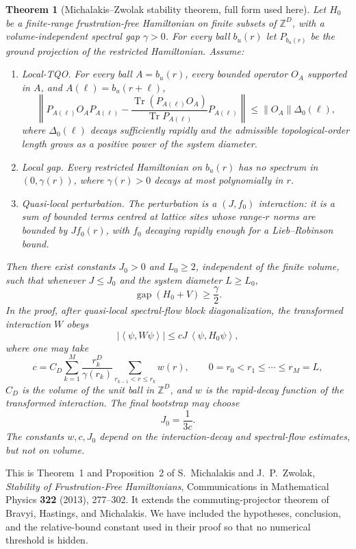 \documentclass[11pt]{article}
\newtheorem{theorem}{Theorem}[section]
\theoremstyle{remark}
\newcommand{\Tr}{\operatorname{Tr}}
\newcommand{\gap}{\operatorname{gap}}
\newcommand{\norm}[1]{\left\lVert #1\right\rVert}
\newcommand{\ip}[2]{\left\langle #1,#2\right\rangle}
\begin{document}
\begin{theorem}[Michalakis--Zwolak stability theorem, full form used
here]
\label{thm:MZ}
Let $H_0$ be a finite-range frustration-free Hamiltonian on finite
subsets of $\mathbb Z^D$, with a volume-independent spectral gap
$\gamma>0$.  For every ball $b_u(r)$ let $P_{b_u(r)}$ be the ground
projection of the restricted Hamiltonian.  Assume:
\begin{enumerate}[label=\textup{(\roman*)}]
\item \emph{Local-TQO.}  For every ball $A=b_u(r)$, every bounded
operator $O_A$ supported in $A$, and
$A(\ell)=b_u(r+\ell)$,
\[
 \left\|
 P_{A(\ell)}O_AP_{A(\ell)}
 -\frac{\Tr(P_{A(\ell)}O_A)}
 {\Tr P_{A(\ell)}}P_{A(\ell)}
 \right\|
 \leq\norm{O_A}\Delta_0(\ell),
\tag{4.6}\label{eq:MZLTQO}
\]
where $\Delta_0(\ell)$ decays sufficiently rapidly and the admissible
topological-order length grows as a positive power of the system
diameter.
\item \emph{Local gap.}  Every restricted Hamiltonian on $b_u(r)$ has
no spectrum in $(0,\gamma(r))$, where $\gamma(r)>0$ decays at most
polynomially in $r$.
\item \emph{Quasi-local perturbation.}  The perturbation is a
$(J,f_0)$ interaction: it is a sum of bounded terms centred at lattice
sites whose range-$r$ norms are bounded by $Jf_0(r)$, with $f_0$
decaying rapidly enough for a Lieb--Robinson bound.
\end{enumerate}
Then there exist constants $J_0>0$ and $L_0\geq2$, independent of the
finite volume, such that whenever $J\leq J_0$ and the system diameter
$L\geq L_0$,
\[
 \gap(H_0+V)\geq\frac{\gamma}{2}.
\tag{4.7}\label{eq:MZgap}
\]
In the proof, after quasi-local spectral-flow block diagonalization,
the transformed interaction $W$ obeys
\[
 |\ip{\psi}{W\psi}|
 \leq cJ\,\ip{\psi}{H_0\psi},
\tag{4.8}\label{eq:MZrelative}
\]
where one may take
\[
 c=C_D\sum_{k=1}^{M}
 \frac{r_k^D}{\gamma(r_k)}
 \sum_{r_{k-1}<r\leq r_k}w(r),
\qquad
 0=r_0<r_1\leq\cdots\leq r_M=L,
\tag{4.9}\label{eq:MZc}
\]
$C_D$ is the volume of the unit ball in $\mathbb Z^D$, and $w$ is the
rapid-decay function of the transformed interaction.  The final
bootstrap may choose
\[
 J_0=\frac1{3c}.
\tag{4.10}\label{eq:MZJ0}
\]
The constants $w,c,J_0$ depend on the interaction-decay and
spectral-flow estimates, but not on volume.
\end{theorem}

This is Theorem~1 and Proposition~2 of
S.~Michalakis and J.~P.~Zwolak,
\emph{Stability of Frustration-Free Hamiltonians},
Communications in Mathematical Physics \textbf{322} (2013), 277--302.
It extends the commuting-projector theorem of Bravyi, Hastings, and
Michalakis.  We have included the hypotheses, conclusion, and the
relative-bound constant used in their proof so that no numerical
threshold is hidden.
\end{document}
